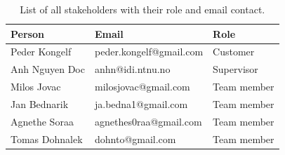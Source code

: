\begin{table}[!h]\centering
\caption{List of all stakeholders with their role and email contact. }
\label{tab:stakeholders_summary}
\def\arraystretch{1.15}
\begin{tabular}{lll}
\toprule[1mm]
\textbf{Person} & \textbf{Email} & \textbf{Role}\\
\midrule
Peder Kongelf & peder.kongelf@gmail.com  & Customer\\
\midrule
Anh Nguyen Doc	 & anhn@idi.ntnu.no & Supervisor \\
\midrule
Milos Jovac &  milosjovac@gmail.com & Team member  \\
Jan Bednarik &  ja.bedna1@gmail.com & Team member\\
Agnethe Soraa & agnethes0raa@gmail.com & Team member  \\
Tomas Dohnalek & dohnto@gmail.com & Team member \\
\bottomrule[1mm]

\end{tabular}
\end{table}